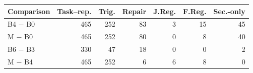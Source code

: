 \begin{tabular}{lrrrrrr}
\toprule
Comparison & Task--rep. & Trig. & Repair & J.Reg. & F.Reg. & Sec.-only \\
\midrule
B4 $-$ B0 & 465 & 252 & 83 & 3 & 15 & 45 \\
M $-$ B0 & 465 & 252 & 80 & 0 & 8 & 40 \\
B6 $-$ B3 & 330 & 47 & 18 & 0 & 0 & 2 \\
M $-$ B4 & 465 & 252 & 6 & 6 & 8 & 0 \\
\bottomrule
\end{tabular}
